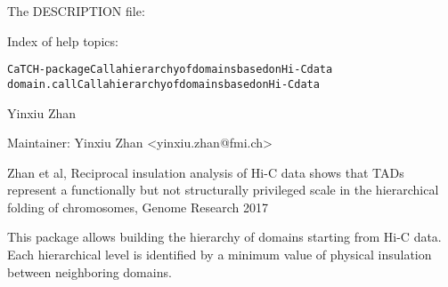 \documentclass[a4paper]{book}
\begin{document}
\begin{Details}\relax

The DESCRIPTION file:


Index of help topics:
\begin{alltt}
CaTCH-package           Call a hierarchy of domains based on Hi-C data
domain.call             Call a hierarchy of domains based on Hi-C data
\end{alltt}

\end{Details}
%
\begin{Author}\relax
Yinxiu Zhan

Maintainer: Yinxiu Zhan <yinxiu.zhan@fmi.ch>
\end{Author}
%
\begin{References}\relax
Zhan et al, Reciprocal insulation analysis of Hi-C data shows that TADs represent a functionally but not structurally privileged scale in the hierarchical folding of chromosomes, Genome Research 2017
\end{References}
%
\begin{Description}\relax
This package allows building the hierarchy of domains
starting from Hi-C data. Each hierarchical level is identified
by a minimum value of physical insulation between
neighboring domains.
\end{Description}
\end{document}
